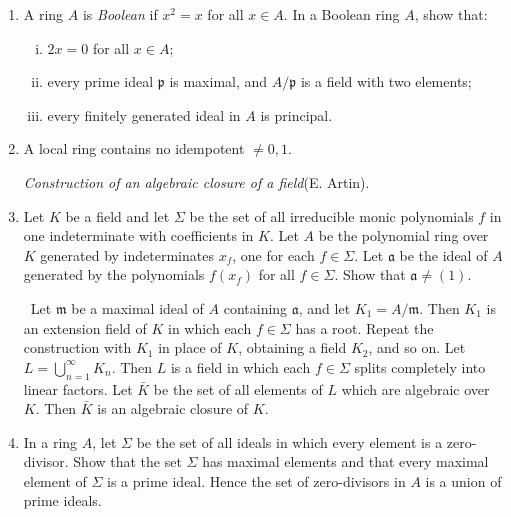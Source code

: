 \begin{enumerate}
    \item \label{exer11-chapter1}A ring $A$ is \emph{Boolean} if $x^2 = x$ for all $x \in A$. In a Boolean ring $A$, show that:
    \begin{enumerate}[i)]
        \item $2x = 0$ for all $x \in A$;
        \item every prime ideal $\mathfrak{p}$ is maximal, and $A/\mathfrak{p}$ is a field with two elements;
        \item every finitely generated ideal in $A$ is principal.
    \end{enumerate}

    \item \label{exer12-chapter1}A local ring contains no idempotent $\neq 0, 1$.

    \emph{Construction of an algebraic closure of a field}(E. Artin). 
    \item \label{exer13-chapter1}Let $K$ be a field and let $\Sigma$ be the set of all irreducible monic polynomials $f$ in one indeterminate with coefficients in $K$. Let $A$ be the polynomial ring over $K$ generated by indeterminates $x_f$, one for each $f \in \Sigma$. Let $\mathfrak{a}$ be the ideal of $A$ generated by the polynomials $f(x_f)$ for all $f \in \Sigma$. Show that $\mathfrak{a} \neq (1)$.
    
    \quad\, Let $\mathfrak{m}$ be a maximal ideal of $A$ containing $\mathfrak{a}$, and let $K_1 = A/\mathfrak{m}$. Then $K_1$ is an extension field of $K$ in which each $f \in \Sigma$ has a root. Repeat the construction with $K_1$ in place of $K$, obtaining a field $K_2$, and so on. Let $L = \bigcup_{n=1}^\infty K_n$. Then $L$ is a field in which each $f \in \Sigma$ splits completely into linear factors. Let $\bar{K}$ be the set of all elements of $L$ which are algebraic over $K$. Then $\bar{K}$ is an algebraic closure of $K$.

    \item \label{exer14-chapter1}In a ring $A$, let $\Sigma$ be the set of all ideals in which every element is a zero-divisor. Show that the set $\Sigma$ has maximal elements and that every maximal element of $\Sigma$ is a prime ideal. Hence the set of zero-divisors in $A$ is a union of prime ideals.


\end{enumerate}
